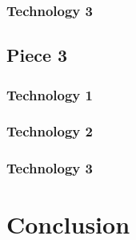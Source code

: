 \documentclass[letterpaper,10pt,titlepage,draftclsnofoot,onecolumn,onesided] {IEEEtran}
\begin{document}
\subsubsection{Technology 3}

\subsection{Piece 3}
\subsubsection{Technology 1}
\subsubsection{Technology 2}
\subsubsection{Technology 3}

\section{Conclusion}



\end{document}
